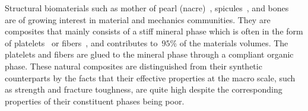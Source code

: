 \documentclass[preprint,12pt,times]{elsarticle}
\numberwithin{equation}{section}
\renewcommand{\>}{$\Rightarrow$}
\begin{document}

Structural biomaterials such as mother of pearl (nacre)~\cite{jackson1988mechanical}, spicules~\cite{monn2015new}, and bones~\cite{wegst2015bioinspired} are of growing interest in material and mechanics communities.
%
They are composites that mainly consists of a stiff mineral phase which is often in the form of platelets~\cite{currey1977mechanical, meyers2008biological, espinosa2011tablet} or fibers~\cite{Aizenberg2005, zhang2011structure, li2015hierarchical}, and contributes to~$95\%$ of the materials volumes.
%
The platelets and fibers are glued to the mineral phase through a compliant organic phase.
%
These natural composites are distinguished from their synthetic counterparts by the facts that their effective properties at the macro scale, such as strength and fracture toughness, are quite high despite the corresponding properties of their constituent phases being poor.
%

\end{document}
